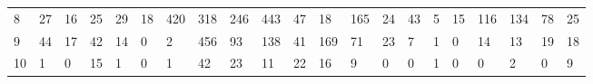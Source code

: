 \documentclass[letterpaper]{article} \usepackage{aaai21}  \usepackage{times}  \usepackage{helvet} \usepackage{courier}  \usepackage[hyphens]{url}  \usepackage{graphicx} \urlstyle{rm} \def\UrlFont{\rm}  \usepackage{natbib}  \usepackage{caption} \frenchspacing  \setlength{\pdfpagewidth}{8.5in}  \setlength{\pdfpageheight}{11in}  \usepackage{lscape}
\begin{document}
\begin{table*}[htb!]
{\begin{tabular}{lllllllllllllllllllll}
8  & 27      & 16   & 25       & 29               & 18  & 420     & 318     & 246       & 443  & 47       & 18      & 165  & 24               & 43           & 5               & 15    & 116      & 134  & 78   & 25      \\
9  & 44      & 17   & 42       & 14               & 0   & 2       & 456     & 93        & 138  & 41       & 169     & 71   & 23               & 7            & 1               & 0     & 14       & 13   & 19   & 18      \\
10 & 1       & 0    & 15       & 1                & 0   & 1       & 42      & 23        & 11   & 22       & 16      & 9    & 0                & 0            & 1               & 0     & 0        & 2    & 0    & 9\\
\hline
\end{tabular}
}
\end{table*}
\end{document}

